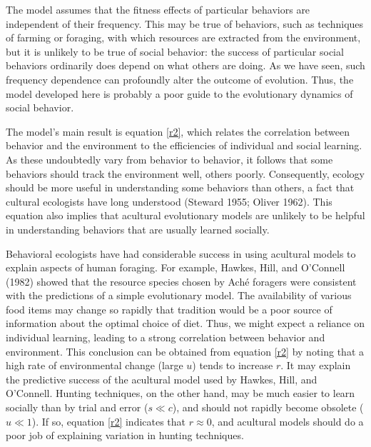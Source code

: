 \documentclass[11pt]{article}
\begin{document}
The model assumes that the fitness effects of particular behaviors are
independent of their frequency.  This may be true of behaviors, such as
techniques of farming or foraging, with which resources are extracted from
the environment, but it is unlikely to be true of social behavior: the
success of particular social behaviors ordinarily does depend on what
others are doing.  As we have seen, such frequency dependence can
profoundly alter the outcome of evolution.  Thus, the model developed here
is probably a poor guide to the evolutionary dynamics of social behavior.

The model's main result is equation \ref{r2}, which relates the correlation
between behavior and the environment to the efficiencies of individual and
social learning.  As these undoubtedly vary from behavior to behavior, it
follows that some behaviors should track the environment well, others
poorly.  Consequently, ecology should be more useful in understanding some
behaviors than others, a fact that cultural ecologists have long
understood (Steward 1955; Oliver 1962).  This equation also implies that
acultural evolutionary models are unlikely to be helpful in understanding
behaviors that are usually learned socially. 

Behavioral ecologists have had considerable success in using acultural
models to explain aspects of human foraging.  For example, Hawkes, Hill,
and O'Connell (1982) showed that the resource species chosen by
Ach\'{e} foragers were consistent with the predictions of a simple
evolutionary model.  The availability of various food items may
change so rapidly that tradition would be a poor source of
information about the optimal choice of diet.  Thus, we might expect
a reliance on individual learning, leading to a strong correlation
between behavior and environment.  This conclusion can be obtained
from equation \ref{r2} by noting that a high rate of environmental
change (large $u$) tends to increase $r$.  It may explain the
predictive success of the acultural model used by Hawkes, Hill, and
O'Connell.  Hunting techniques, on the other hand, may be much easier
to learn socially than by trial and error ($s \ll c$), and should not
rapidly become obsolete ($u \ll 1$).  If so, equation \ref{r2}
indicates that $r \approx 0$, and acultural models should do a poor
job of explaining variation in hunting techniques. 
\end{document}
